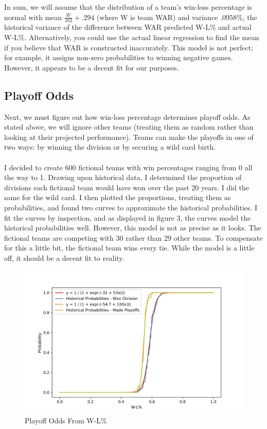 \documentclass[11pt]{article}
\begin{document}
In sum, we will assume that the distribution of a team's win-loss percentage is normal with mean $\frac{W}{162} + .294$ (where W is team WAR) and variance $.0958\%$, the historical variance of the difference between WAR predicted W-L\% and actual W-L\%. Alternatively, you could use the actual linear regression to find the mean if you believe that WAR is constructed inaccurately. This model is not perfect; for example, it assigns non-zero probabilities to winning negative games. However, it appears to be a decent fit for our purposes.

\subsection{Playoff Odds}

Next, we must figure out how win-loss percentage determines playoff odds. As stated above, we will ignore other teams (treating them as random rather than looking at their projected performance). Teams can make the playoffs in one of two ways: by winning the division or by securing a wild card birth.\\\\
I decided to create 600 fictional teams with win percentages ranging from 0 all the way to 1. Drawing upon historical data, I determined the proportion of divisions each fictional team would have won over the past 20 years. I did the same for the wild card. I then plotted the proportions, treating them as probabilities, and found two curves to approximate the historical probabilities. I fit the curves by inspection, and as displayed in figure 3, the curves model the historical probabilities well. However, this model is not as precise as it looks. The fictional teams are competing with 30 rather than 29 other teams. To compensate for this a little bit, the fictional team wins every tie. While the model is a little off, it should be a decent fit to reality.

\begin{figure}
  \includegraphics[width=\linewidth]{figure3.png}
  \caption{Playoff Odds From W-L\%}
  \label{fig:figure3}
\end{figure} 
\end{document}
